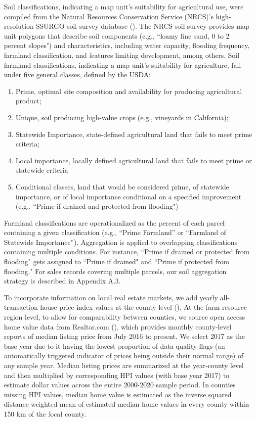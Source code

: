 \documentclass[12pt]{article}
\begin{document}
Soil classifications, indicating a map unit's suitability for agricultural use, were compiled from the Natural Resources Conservation Service (NRCS)’s high-resolution SSURGO soil survey database (\cite{SoilSurveyStaffSoilStates}). The NRCS soil survey provides map unit polygons that describe soil components (e.g., ``loamy fine sand, 0 to 2 percent slopes") and characteristics, including water capacity, flooding frequency, farmland classification, and features limiting development, among others. Soil farmland classifications, indicating a map unit's suitability for agriculture, fall under five general classes, defined by the USDA:
\begin{enumerate}
    \item Prime, optimal site composition and availability for producing agricultural product;  
    \item Unique, soil producing high-value crops (e.g., vineyards in California); 
    \item Statewide Importance, state-defined agricultural land that fails to meet prime criteria;
    \item Local importance, locally defined agricultural land that fails to meet prime or statewide criteria
    \item Conditional classes, land that would be considered prime, of statewide importance, or of local importance conditional on a specified improvement (e.g., ``Prime if drained and protected from flooding")
\end{enumerate}

Farmland classifications are operationalized as the percent of each parcel containing a given classification (e.g., ``Prime Farmland” or ``Farmland of Statewide Importance”). Aggregation is applied to overlapping classifications containing multiple conditions. For instance, ``Prime if drained or protected from flooding" gets assigned to ``Prime if drained" and ``Prime if protected from flooding." For sales records covering multiple parcels, our soil aggregation strategy is described in Appendix A.3. 

To incorporate information on local real estate markets, we add yearly all-transaction house price index values at the county level (\cite{FederalHousing2022}). At the farm resource region level, to allow for comparability between counties, we source open access home value data from Realtor.com (\cite{RealtorData}), which provides monthly county-level reports of median listing price from July 2016 to present. We select 2017 as the base year due to it having the lowest proportion of data quality flags (an automatically triggered indicator of prices being outside their normal range) of any sample year. Median listing prices are summarized at the year-county level and then multiplied by corresponding HPI values (with base year 2017) to estimate dollar values across the entire 2000-2020 sample period. In counties missing HPI values, median home value is estimated as the inverse squared distance weighted mean of estimated median home values in every county within 150 km of the focal county. 
\end{document}
